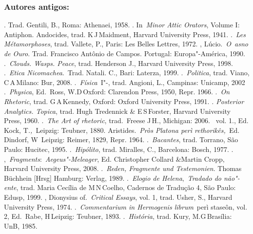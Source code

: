  

\subsubsection{Autores antigos:}

 

\begin{bibliohedra}
. Trad. Gentili, B., Roma: Athenaei, 1958.
. In~\emph{Minor Attic Orators}, Volume I: Antiphon.
  Andocides, trad. K\,J\,Maidment, Harvard University Press, 1941.
.~\emph{Les Métamorphoses}, trad. Vallete, P., Paris: Les Belles
  Lettres, 1972.
, Lúcio.~\emph{O~asno de Ouro}. Trad. Francisco Antônio de
  Campos. Portugal: Europa"-América, 1990.
.~\emph{Clouds. Wasps. Peace}, trad. Henderson J., Harvard
  University Press, 1998.
.~\emph{Etica Nicomachea}.~Trad. Natali. C., Bari: Laterza,
  1999.
.~\emph{Politica}, trad. Viano, C\,A\,Milano: Bur, 2008.
.~\emph{Física}~I"-, trad. Angioni, L., Campinas: Unicamp,
  2002
.~\emph{Physica}, Ed.~Ross, W.D\,Oxford: Clarendon Press,
  1950, Repr. 1966.
.~\emph{On Rhetoric}, trad. G\,A\,Kennedy, Oxford: Oxford
  University Press, 1991.
\emph{. Posterior Analytics. Topica}, trad. Hugh Tredennick
  \& E\,S\,Forster, Harvard University Press, 1960.
.~\emph{The Art of rhetoric}, trad.~Freese J\,H., Michigan:
  2006.
~vol. 1., Ed. Kock,
  T\emph{.,~}Leipzig: Teubner, 1880.
 Aristides.~\emph{Pròs Platona perì rethorikês,~}Ed. Dindorf, W\,  Leipzig: Reimer, 1829, Repr. 1964.
.~\emph{Bacantes}, trad.  Torrano, São Paulo: Hucitec,
  1995.
.~\emph{Hipólito}, trad. Miralles, C., Barcelona: Bosch,
  1977.
. ,~\emph{Fragments}:~\emph{Aegeus"-Meleager}, Ed.
  Christopher Collard \&Martin Cropp, Harvard University Press, 2008.
 .~\emph{Reden, Fragmente und Testemonien}. Thomas Büchhein
  [Hrsg] Hamburg: Verlag, 1989.
.~\emph{Elogio de Helena},~\emph{Tradado do não"-ente}, trad.
  Maria Cecília de M\,N\,Coelho, Cadernos de Tradução 4, São Paulo:
  Edusp, 1999.
, Dionysius of.~\emph{Critical Essays}, vol. 1, trad.
  Usher, S., Harvard University Press, 1974.
.~\emph{Commentarium in Hermogenis librum}~perì staseôn,
  vol. 2, Ed.~Rabe, H\,Leipzig: Teubner, 1893.
.~\emph{História}, trad. Kury, M.G\,Brasília: UnB, 1985.

\end{bibliohedra}
